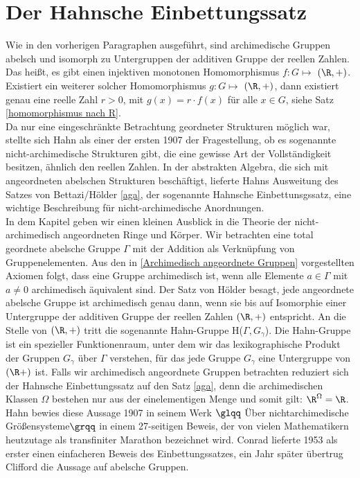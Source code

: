 \section{Der Hahnsche Einbettungssatz}\label{HahnscheEinbettungssatz}

Wie in den vorherigen Paragraphen ausgeführt, sind archimedische Gruppen abelsch und isomorph zu Untergruppen der additiven Gruppe der reellen Zahlen. Das heißt, es gibt einen injektiven monotonen Homomorphismus $f\colon G \mapsto$ $\left(\R , +\right)$. Existiert ein weiterer solcher Homomorphismus $g\colon G \mapsto$ $\left(\R, +\right)$, dann existiert genau eine reelle Zahl $r > 0$, mit $g(x) = r\cdot f(x)$ für alle $x \in G$, siehe Satz \ref{homomorphismus nach R}.\\
Da nur eine eingeschränkte Betrachtung geordneter Strukturen möglich war, stellte sich Hahn als einer der ersten 1907 der Fragestellung, ob es sogenannte nicht-archimedische Strukturen gibt, die eine gewisse Art der Vollständigkeit besitzen, ähnlich den reellen Zahlen.\cite{hahn07} In der abstrakten Algebra, die sich mit angeordneten abelschen Strukturen beschäftigt, lieferte Hahns Ausweitung des Satzes von Bettazi/Hölder \ref{aga}, der sogenannte Hahnsche Einbettunsgssatz, eine wichtige Beschreibung für nicht-archimedische Anordnungen. \\
In dem Kapitel %
geben wir einen kleinen Ausblick in die Theorie der nicht-archimedisch angeordneten Ringe und Körper. %
\vspace{0.8cm}
Wir betrachten eine total geordnete abelsche Gruppe $\Gamma$ mit der Addition als Verknüpfung von Gruppenelementen. Aus den in \ref{Archimedisch angeordnete Gruppen} vorgestellten Axiomen folgt, dass eine Gruppe archimedisch ist, wenn alle Elemente $a \in \Gamma$ mit $a \neq 0$ archimedisch äquivalent sind. Der Satz von Hölder besagt, jede angeordnete abelsche Gruppe ist archimedisch genau dann, wenn sie bis auf Isomorphie einer Untergruppe der additiven Gruppe der reellen Zahlen $\left(\R, +\right)$ entspricht. An die Stelle von $\left(\R, +\right)$ tritt die sogenannte Hahn-Gruppe H($\Gamma, G_\gamma$). Die Hahn-Gruppe ist ein spezieller Funktionenraum, unter dem wir das lexikographische Produkt der Gruppen $G_\gamma$ über $\Gamma$ verstehen, für das jede Gruppe $G_\gamma$ eine Untergruppe von $\left(\R +\right)$ ist. Falls wir archimedisch angeordnete Gruppen betrachten reduziert sich der Hahnsche Einbettungssatz auf den Satz \ref{aga}, denn die archimedischen Klassen $\Omega$ bestehen nur aus der einelementigen Menge und somit gilt: $\R^\Omega = \R $.\\
Hahn bewies diese Aussage 1907 in seinem Werk $\glqq$ Über nichtarchimedische Größensysteme$\grqq$ in einem 27-seitigen Beweis, der von vielen Mathematikern heutzutage als transfiniter Marathon bezeichnet wird. Conrad lieferte 1953 als erster einen einfacheren Beweis des Einbettungssatzes, ein Jahr später übertrug Clifford die Aussage auf abelsche Gruppen. \\

